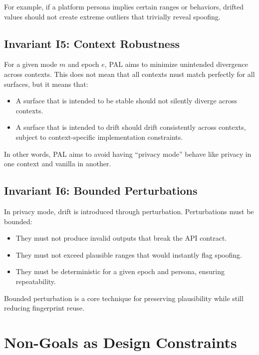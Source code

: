 \documentclass[11pt]{report}
\begin{document}
For example, if a platform persona implies certain ranges or behaviors, drifted values should not create extreme outliers that trivially reveal spoofing.

\subsection{Invariant I5: Context Robustness}

For a given mode $m$ and epoch $e$, PAL aims to minimize unintended divergence across contexts. This does not mean that all contexts must match perfectly for all surfaces, but it means that:

\begin{itemize}
    \item A surface that is intended to be stable should not silently diverge across contexts.
    \item A surface that is intended to drift should drift consistently across contexts, subject to context-specific implementation constraints.
\end{itemize}

In other words, PAL aims to avoid having ``privacy mode'' behave like privacy in one context and vanilla in another.

\subsection{Invariant I6: Bounded Perturbations}

In privacy mode, drift is introduced through perturbation. Perturbations must be bounded:

\begin{itemize}
    \item They must not produce invalid outputs that break the API contract.
    \item They must not exceed plausible ranges that would instantly flag spoofing.
    \item They must be deterministic for a given epoch and persona, ensuring repeatability.
\end{itemize}

Bounded perturbation is a core technique for preserving plausibility while still reducing fingerprint reuse.

\section{Non-Goals as Design Constraints}
\end{document}
